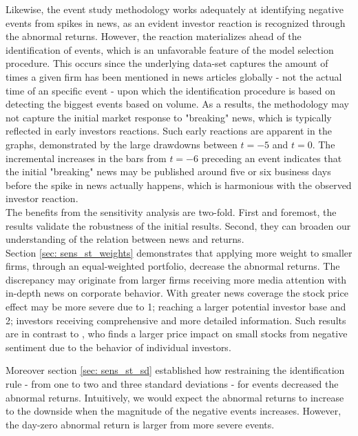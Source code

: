 Likewise, the event study methodology works adequately at identifying negative events from spikes in news, as an evident investor reaction is recognized through the abnormal returns. However, the reaction materializes ahead of the identification of events, which is an unfavorable feature of the model selection procedure. This occurs since the underlying data-set captures the amount of times a given firm has been mentioned in news articles globally - not the actual time of an specific event - upon which the identification procedure is based on detecting the biggest events based on volume. As a results, the methodology may not capture the initial market response to "breaking" news, which is typically reflected in early investors reactions. Such early reactions are apparent in the graphs, demonstrated by the large drawdowns between $t = -5$ and $t = 0$. The incremental increases in the bars from $t=-6$ preceding an event indicates that the initial "breaking" news may be published around five or six business days before the spike in news actually happens, which is harmonious with the observed investor reaction.  \\


The benefits from the sensitivity analysis are two-fold. First and foremost, the results validate the robustness of the initial results. Second, they can broaden our understanding of the relation between news and returns. \\
Section \ref{sec: sens_st_weights} demonstrates that applying more weight to smaller firms, through an equal-weighted portfolio, decrease the abnormal returns. The discrepancy may originate from larger firms receiving more media attention with in-depth news on corporate behavior. With greater news coverage the stock price effect may be more severe due to 1; reaching a larger potential investor base and 2; investors receiving comprehensive and more detailed information. Such results are in contrast to \cite{tetlock_sentiment}, who finds a larger price impact on small stocks from negative sentiment due to the behavior of individual investors. 

Moreover section \ref{sec: sens_st_sd} established how restraining the identification rule - from one to two and three standard deviations - for events decreased the abnormal returns. Intuitively, we would expect the abnormal returns to increase to the downside when the magnitude of the negative events increases. However, the day-zero abnormal return is larger from more severe events. \\

